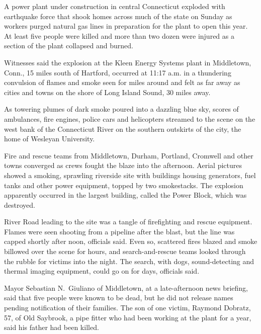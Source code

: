 ﻿\documentclass[12pt]{article}
\begin{document}
\lettrine{A}{} power plant under construction in central Connecticut
exploded with earthquake force that shook homes across much of the state on Sunday as workers purged
natural gas lines in preparation for the plant to open this year. At least five people were killed
and more than two dozen were injured as a section of the plant collapsed and burned.


Witnesses said the explosion at the Kleen Energy Systems plant in Middletown, Conn., 15 miles south
of Hartford, occurred at 11:17 a.m. in a thundering convulsion of flames and smoke seen for miles
around and felt as far away as cities and towns on the shore of Long Island Sound, 30 miles away.

As towering plumes of dark smoke poured into a dazzling blue sky, scores of ambulances, fire
engines, police cars and helicopters streamed to the scene on the west bank of the Connecticut River
on the southern outskirts of the city, the home of Wesleyan University.

Fire and rescue teams from Middletown, Durham, Portland, Cromwell and other towns converged as crews
fought the blaze into the afternoon. Aerial pictures showed a smoking, sprawling riverside site with
buildings housing generators, fuel tanks and other power equipment, topped by two smokestacks. The
explosion apparently occurred in the largest building, called the Power Block, which was destroyed.

River Road leading to the site was a tangle of firefighting and rescue equipment. Flames were seen
shooting from a pipeline after the blast, but the line was capped shortly after noon, officials
said. Even so, scattered fires blazed and smoke billowed over the scene for hours, and
search-and-rescue teams looked through the rubble for victims into the night. The search, with dogs,
sound-detecting and thermal imaging equipment, could go on for days, officials said.

Mayor Sebastian N.~Giuliano of Middletown, at a late-afternoon news briefing, said that five people
were known to be dead, but he did not release names pending notification of their families. The son
of one victim, Raymond Dobratz, 57, of Old Saybrook, a pipe fitter who had been working at the plant
for a year, said his father had been killed.
\end{document}
